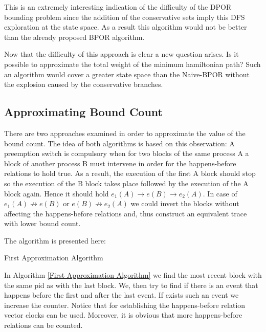 This is an extremely interesting indication of the difficulty of the DPOR bounding problem since the addition of the conservative sets imply this DFS
exploration at the state space. As a result this algorithm would not be better than the already proposed BPOR algorithm.

Now that the difficulty of this approach is clear a new question arises. Is it possible to approximate the total weight of the minimum hamiltonian path?
Such an algorithm would cover a greater state space than the Naive-BPOR without the explosion caused by the conservative branches.

\subsection{Approximating Bound Count}
There are two approaches examined in order to approximate the value of the bound count. The idea of both algorithms is based on this observation: 
A preemption switch is compulsory
when for two blocks of the same process A a block of another process B must intervene in order for the happens-before relations to hold true. As a result, the execution of 
the first A block should stop so the execution of the B block takes place followed by the execution of the A block again. Hence it should hold $e_1(A) \rightarrow e(B) \rightarrow e_2(A)$.
In case of $e_1(A) \not \rightarrow e(B)$ or $e(B) \not \rightarrow e_2(A)$ we could invert the blocks without affecting the happens-before relations and, thus construct an
equivalent trace with lower bound count.

The algorithm is presented here:\\

\begin{algorithm}[H]
    \caption{First Approximation Algorithm}
    \label{First Approximation Algorithm}
\end{algorithm}

In Algorithm \ref{First Approximation Algorithm} we find the most recent block with the same pid as with the last block. We, then try to find if there is an event that happens before the first
and after the last event. If exists such an event we increase the counter.
Notice that for establishing the happens-before relation vector clocks can be used.
Moreover, it is obvious that more happens-before relations can be counted.


